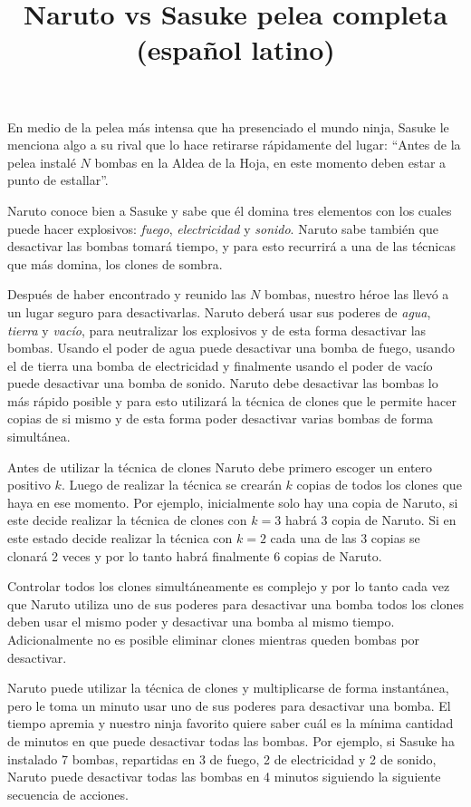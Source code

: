 \documentclass{oci}
\title{Naruto vs Sasuke pelea completa (español latino)}
\begin{document}
\begin{problemDescription}
En medio de la pelea más intensa que ha presenciado el mundo ninja, Sasuke le
menciona algo a su rival que lo hace retirarse rápidamente del lugar: ``Antes de
la pelea instalé $N$ bombas en la Aldea de la Hoja, en este momento deben estar
a punto de estallar''.

Naruto conoce bien a Sasuke y sabe que él domina tres elementos con los cuales
puede hacer explosivos: \emph{fuego}, \emph{electricidad} y \emph{sonido}.
Naruto sabe también que desactivar las bombas tomará tiempo, y para esto
recurrirá a una de las técnicas que más domina, los clones de sombra.

Después de haber encontrado y reunido las $N$ bombas, nuestro héroe las llevó a
un lugar seguro para desactivarlas.
Naruto deberá usar sus poderes de \emph{agua}, \emph{tierra} y \emph{vacío},
para neutralizar los explosivos y de esta forma desactivar las bombas.
Usando el poder de agua puede desactivar una bomba de fuego, usando el de
tierra una bomba de electricidad y finalmente usando el poder de vacío puede
desactivar una bomba de sonido.
Naruto debe desactivar las bombas lo más rápido posible y para esto utilizará la
técnica de clones que le permite hacer copias de si mismo y de esta forma poder 
desactivar varias bombas de forma simultánea.

Antes de utilizar la técnica de clones Naruto debe primero escoger un entero
positivo $k$.
Luego de realizar la técnica se crearán $k$ copias de todos los clones que
haya en ese momento.
Por ejemplo, inicialmente solo hay una copia de Naruto, si este decide realizar
la técnica de clones con $k=3$ habrá 3 copia de Naruto.
Si en este estado decide realizar la técnica con $k=2$ cada una de las 3 copias
se clonará 2 veces y por lo tanto habrá finalmente 6 copias de Naruto.

Controlar todos los clones simultáneamente es complejo y por lo tanto cada vez
que Naruto utiliza uno de sus poderes para desactivar una bomba todos los clones
deben usar el mismo poder y desactivar una bomba al mismo tiempo.
Adicionalmente no es posible eliminar clones mientras queden bombas por
desactivar.

Naruto puede utilizar la técnica de clones y multiplicarse de forma instantánea,
pero le toma un minuto usar uno de sus poderes para desactivar una bomba.
El tiempo apremia y nuestro ninja favorito quiere saber cuál es la mínima
cantidad de minutos en que puede desactivar todas las bombas.
Por ejemplo, si Sasuke ha instalado 7 bombas, repartidas en 3 de fuego, 2 de
electricidad y 2 de sonido, Naruto puede desactivar todas las bombas en 4
minutos siguiendo la siguiente secuencia de acciones.


\end{problemDescription}
\end{document}
